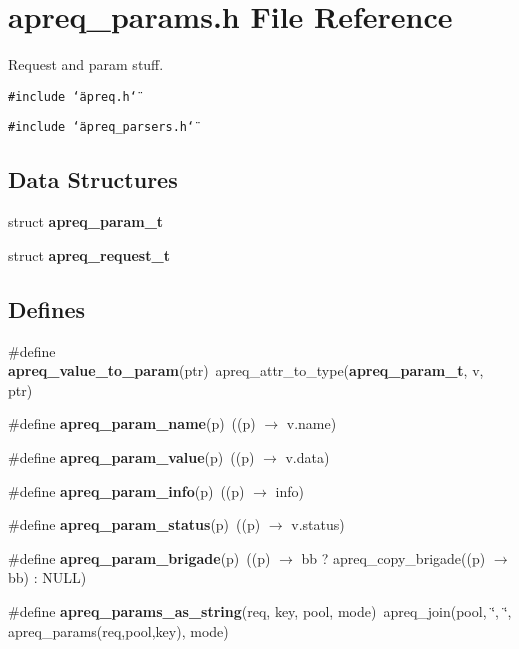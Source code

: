 \section{apreq\_\-params.h File Reference}
\label{apreq__params_8h}
Request and param stuff. 


{\tt \#include \char`\"{}apreq.h\char`\"{}}\par
{\tt \#include \char`\"{}apreq\_\-parsers.h\char`\"{}}\par
\subsection*{Data Structures}
\begin{CompactItemize}
\item 
struct {\bf apreq\_\-param\_\-t}
\item 
struct {\bf apreq\_\-request\_\-t}
\end{CompactItemize}
\subsection*{Defines}
\begin{CompactItemize}
\item 
\#define {\bf apreq\_\-value\_\-to\_\-param}(ptr)\ apreq\_\-attr\_\-to\_\-type({\bf apreq\_\-param\_\-t}, v, ptr)
\item 
\#define {\bf apreq\_\-param\_\-name}(p)\ ((p) $\rightarrow$ v.name)\label{apreq__params_8h_a14}

\item 
\#define {\bf apreq\_\-param\_\-value}(p)\ ((p) $\rightarrow$ v.data)\label{apreq__params_8h_a15}

\item 
\#define {\bf apreq\_\-param\_\-info}(p)\ ((p) $\rightarrow$ info)\label{apreq__params_8h_a16}

\item 
\#define {\bf apreq\_\-param\_\-status}(p)\ ((p) $\rightarrow$ v.status)\label{apreq__params_8h_a17}

\item 
\#define {\bf apreq\_\-param\_\-brigade}(p)\ ((p) $\rightarrow$ bb ? apreq\_\-copy\_\-brigade((p) $\rightarrow$ bb) : NULL)\label{apreq__params_8h_a18}

\item 
\#define {\bf apreq\_\-params\_\-as\_\-string}(req, key, pool, mode)\ apreq\_\-join(pool, \char`\"{}, \char`\"{}, apreq\_\-params(req,pool,key), mode)
\end{CompactItemize}
